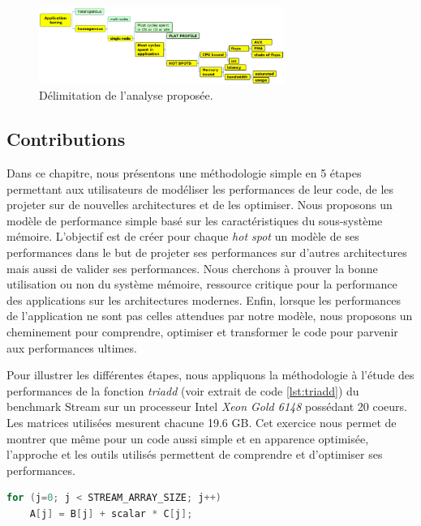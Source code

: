 \begin{figure}
    \center
    \includegraphics[width=8cm]{images/analyse.png}
    \caption{\label{pic_analyse} Délimitation de l'analyse proposée.}
\end{figure}



\subsection{Contributions}
Dans ce chapitre, nous présentons une méthodologie simple en 5 étapes permettant aux utilisateurs de modéliser les performances de leur code, de les projeter sur de nouvelles architectures et de les optimiser. Nous proposons un modèle de performance simple basé sur les caractéristiques du sous-système mémoire. L'objectif est de créer pour chaque \textit{hot spot} un modèle de ses performances dans le but de projeter ses performances sur d'autres architectures mais aussi de valider ses performances. Nous cherchons à prouver la bonne utilisation ou non du système mémoire, ressource critique pour la performance des applications sur les architectures modernes. Enfin, lorsque les performances de l'application ne sont pas celles attendues par notre modèle, nous proposons un cheminement pour comprendre, optimiser et transformer le code pour parvenir aux performances ultimes.

Pour illustrer les différentes étapes, nous appliquons la méthodologie à l'étude des performances de la fonction \textit{triadd} (voir extrait de code \ref{lst:triadd}) du benchmark Stream \cite{McCalpin1995} sur un processeur Intel\textit{ Xeon Gold 6148} possédant 20 coeurs. Les matrices utilisées mesurent chacune 19.6 GB. Cet exercice nous permet de montrer que même pour un code aussi simple et en apparence optimisée, l'approche et les outils utilisés permettent de comprendre et d'optimiser ses performances.

\begin{lstlisting}[language=c,caption=Fonction Triadd extraite du benchmark Stream \ref{McCalpin1995},label={lst:triadd}, 
  basicstyle=\footnotesize, frame=tb,
  xleftmargin=.065\textwidth, xrightmargin=.065\textwidth]
for (j=0; j < STREAM_ARRAY_SIZE; j++)
    A[j] = B[j] + scalar * C[j];
\end{lstlisting}






